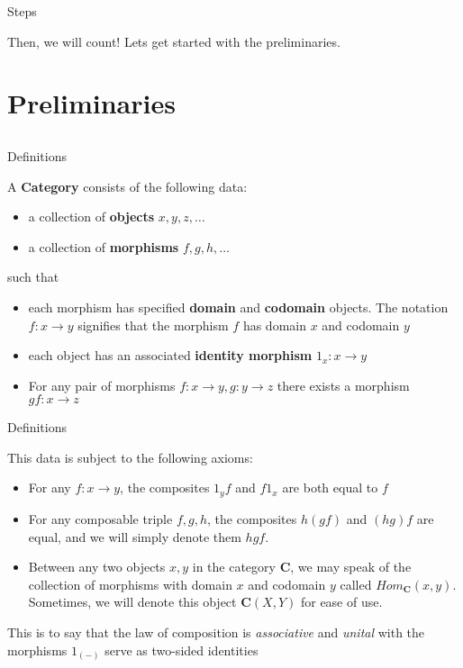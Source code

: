 \documentclass[tikz]{beamer}
\theoremstyle{definition}
\begin{document}
\begin{frame}{Steps}
    
    Then, we will count! Lets get started with the preliminaries.
\end{frame}

\section{Preliminaries}
\subsection{}
\begin{frame}{Definitions}
\begin{definition}[Category]
A \textbf{Category} consists of the following data:
\begin{itemize}
    \item a collection of \textbf{objects} $x, y, z, \ldots$
    \item a collection of \textbf{morphisms} $f, g, h, \ldots$
\end{itemize}{}
 such that 
\begin{itemize}
    \item each morphism has specified \textbf{domain} and \textbf{codomain} objects. The notation $f: x \to y$ signifies that the morphism $f$ has domain $x$ and codomain $y$
    \item each object has an associated \textbf{identity morphism} $1_x : x \to y$
    \item For any pair of morphisms $f: x \to y, g: y \to z$ there exists a morphism $gf: x \to z$
\end{itemize}{}

\end{definition}
\end{frame}
\begin{frame}{Definitions}

This data is subject to the following axioms: 

\begin{itemize}
    \item For any $f: x \to y$, the composites $1_y f$ and  $f 1_x$ are both equal to $f$
    \item For any composable triple $f, g, h$, the composites $h(gf)$ and $(hg)f$ are equal, and we will simply denote them $hgf$.
    \item Between any two objects $x, y$ in the category $\mathbf{C}$, we may speak of the collection of morphisms with domain $x$ and codomain $y$ called $Hom_{\mathbf{C}}(x, y)$. Sometimes, we will denote this object $\mathbf{C}(X, Y)$ for ease of use.
\end{itemize}{}

This is to say that the law of composition is \textit{associative} and \textit{unital} with the morphisms $1_{(-)}$  serve as two-sided identities 
\end{frame}
\end{document}
